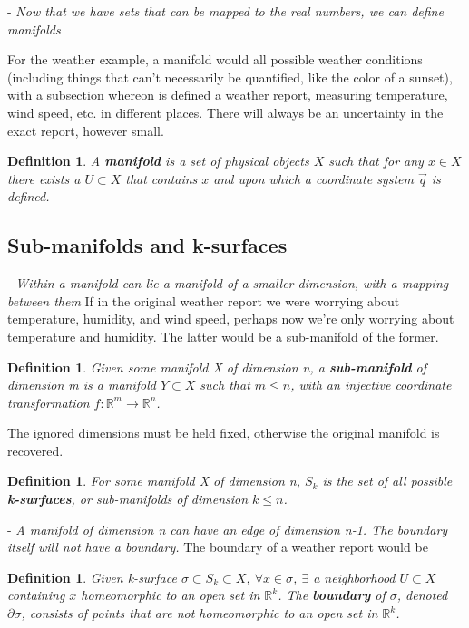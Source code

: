 \documentclass{book}
\newtheorem{defn}[equation]{Definition}
\begin{document}
- \emph{Now that we have sets that can be mapped to the real numbers, we can define manifolds}

For the weather example, a manifold would all possible weather conditions (including things that can't necessarily be quantified, like the color of a sunset), with a subsection whereon is defined a weather report, measuring temperature, wind speed, etc. in different places. There will always be an uncertainty in the exact report, however small.  
 
\begin{defn}
	A \textbf{manifold} is a set of physical objects $X$ such that for any $x \in X$ there exists a $U \subset X$ that contains $x$ and upon which a coordinate system $\vec{q}$ is defined.
\end{defn}




\subsection{Sub-manifolds and k-surfaces}

- \emph{Within a manifold can lie a manifold of a smaller dimension, with a mapping between them}
If in the original weather report we were worrying about temperature, humidity, and wind speed, perhaps now we're only worrying about temperature and humidity. The latter would be a sub-manifold of the former. 

\begin{defn}
	Given some manifold X of dimension n, a \textbf{sub-manifold} of dimension m is a manifold $Y \subset X$ such that $m \leq n$, with an injective coordinate transformation $f: \mathbb{R}^m \to \mathbb{R}^n$. 
\end{defn}
The ignored dimensions must be held fixed, otherwise the original manifold is recovered. 

\begin{defn}
	For some manifold X of dimension n, $S_k$ is the set of all possible \textbf{k-surfaces}, or sub-manifolds of dimension $k \leq n$. 
\end{defn}

- \emph{A manifold of dimension n can have an edge of dimension n-1. The boundary itself will not have a boundary.}
The boundary of a weather report would be 

\begin{defn}
	Given k-surface $\sigma \subset S_k \subset X$, $\forall x \in \sigma$, $\exists$ a neighborhood $U \subset X$ containing $x$ homeomorphic to an open set in $\mathbb{R}^k$. The \textbf{boundary} of $\sigma$, denoted $\partial\sigma$, consists of points that are not homeomorphic to an open set in $\mathbb{R}^k$. 
\end{defn}
\end{document}
